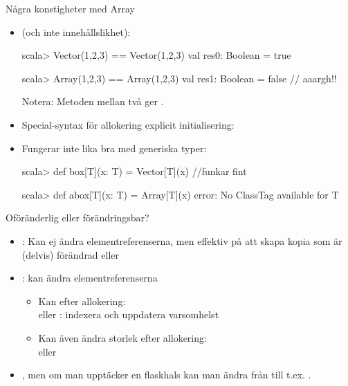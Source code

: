 \begin{Slide}{Några konstigheter med Array}
\begin{itemize}\SlideFontSmall
\item {} (och inte innehållslikhet): 
\begin{REPLnonum}
scala> Vector(1,2,3) == Vector(1,2,3)
val res0: Boolean = true

scala> Array(1,2,3) == Array(1,2,3)
val res1: Boolean = false  // aaargh!!
\end{REPLnonum}
Notera: Metoden \code{==} mellan två  ger .
\item Special-syntax för allokering  explicit initialisering: \\
{\SlideFontSmall{}}
\item Fungerar inte lika bra med generiska typer:
\begin{REPLnonum}
scala> def box[T](x: T) = Vector[T](x)  //funkar fint

scala> def abox[T](x: T) = Array[T](x)
  error: No ClassTag available for T
\end{REPLnonum}
\end{itemize}
\end{Slide}

\begin{Slide}{Oföränderlig eller förändringsbar?}
\begin{itemize}
\item {}:  Kan ej ändra elementreferenserna, men effektiv på att skapa kopia som är (delvis) förändrad  eller 

\item {}: kan ändra elementreferenserna
  \begin{itemize}
  \item Kan  efter allokering: \\  eller : indexera och uppdatera varsomhelst
  \item Kan även ändra storlek efter allokering:
  \\ eller 
  \end{itemize}
\item {}, men om man  upptäcker en flaskhals kan man ändra från  till t.ex. .
\end{itemize}
\end{Slide}



